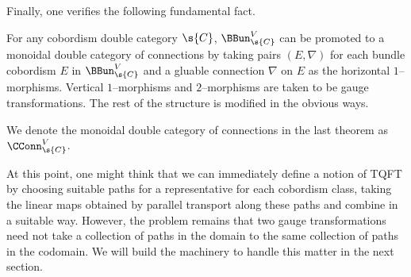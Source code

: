 \documentclass[\PRJWD/Thick_TQFTs_and_Quantum_Information.tex]{subfiles}
\begin{document}
Finally, one verifies the following fundamental fact.

\begin{thm}
For any cobordism double category $\s{C}$, $\BBun^V_{\s{C}}$ can be promoted to
a monoidal double category of connections by taking pairs $(E, \nabla)$ for each
bundle cobordism $E$ in $\BBun^V_{\s{C}}$ and a gluable connection $\nabla$ on
$E$ as the horizontal $1$--morphisms. Vertical $1$--morphisms and $2$--morphisms
are taken to be gauge transformations. The rest of the structure is modified in
the obvious ways.
\end{thm}

\begin{defn}
We denote the monoidal double category of connections in the last theorem as
$\CConn^V_{\s{C}}$.
\end{defn}


At this point, one might think that we can immediately define a notion of TQFT
by choosing suitable paths for a representative for each cobordism class,
taking the linear maps obtained by parallel transport along these paths and
combine in a suitable way. However, the problem remains that two gauge
transformations need not take a collection of paths in the domain to the same
collection of paths in the codomain. We will build the machinery to handle this
matter in the next section.
\end{document}
